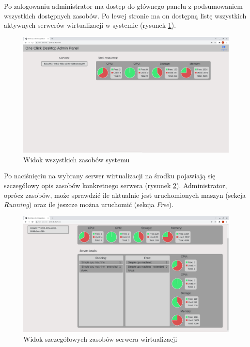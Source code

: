 \documentclass[../opis-rozwiazania.tex]{subfiles}
\begin{document}
Po zalogowaniu administrator ma dostęp do głównego panelu z podsumowaniem wszystkich dostępnych zasobów.
Po lewej stronie ma on dostępną listę wszystkich aktywnych serwerów wirtualizacji w systemie (rysunek \ref{figure:system_interaction.admin.panel}).

\begin{figure}[h!]
  \centering
  \includegraphics[width=\textwidth]{resources/admin_panel_home.png}
  \caption{Widok wszystkich zasobów systemu}
  \label{figure:system_interaction.admin.panel}
\end{figure}

Po naciśnięciu na wybrany serwer wirtualizacji na środku pojawiają się szczegółowy opis zasobów konkretnego serwera (rysunek \ref{figure:system_interaction.admin.details}).
Administrator, oprócz zasobów, może sprawdzić ile aktualnie jest uruchomionych maszyn (sekcja \textit{Running}) oraz ile jeszcze można uruchomić (sekcja \textit{Free}).

\begin{figure}[h!]
  \centering
  \includegraphics[width=\textwidth]{resources/admin_panel_details.png}
  \caption{Widok szczegółowych zasobów serwera wirtualizacji}
  \label{figure:system_interaction.admin.details}
\end{figure}
\end{document}
